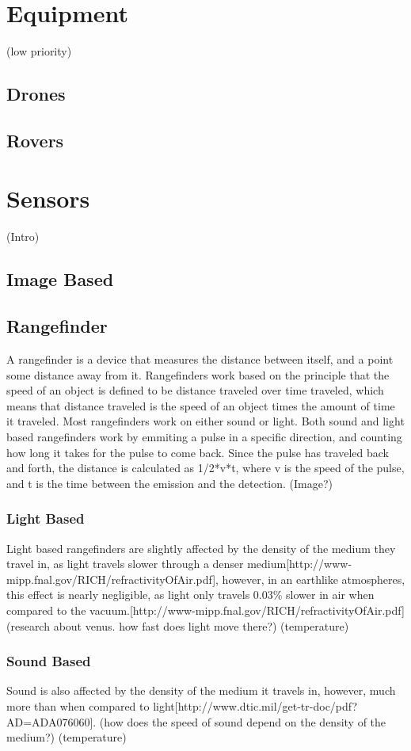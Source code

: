 \section{Equipment}
(low priority)
\subsection{Drones}
\subsection{Rovers}

\section{Sensors}
(Intro)
\subsection{Image Based}

\subsection{Rangefinder}
A rangefinder is a device that measures the distance between itself, and a point some distance away from it. Rangefinders work based on the principle that the speed of an object is defined to be distance traveled over time traveled, which means that distance traveled is the speed of an object times the amount of time it traveled. Most rangefinders work on either sound or light. Both sound and light based rangefinders work by emmiting a pulse in a specific direction, and counting how long it takes for the pulse to come back. Since the pulse has traveled back and forth, the distance is calculated as {1/2*v*t}, where {v} is the speed of the pulse, and {t} is the time between the emission and the detection.
(Image?)
\subsubsection{Light Based}
Light based rangefinders are slightly affected by the density of the medium they travel in, as light travels slower through a denser medium[http://www-mipp.fnal.gov/RICH/refractivityOfAir.pdf], however, in an earthlike atmospheres, this effect is nearly negligible, as light only travels 0.03\% slower in air when compared to the vacuum.[http://www-mipp.fnal.gov/RICH/refractivityOfAir.pdf] (research about venus. how fast does light move there?)
(temperature)
\subsubsection{Sound Based}
Sound is also affected by the density of the medium it travels in, however, much more than when compared to light[http://www.dtic.mil/get-tr-doc/pdf?AD=ADA076060]. (how does the speed of sound depend on the density of the medium?)
(temperature)
